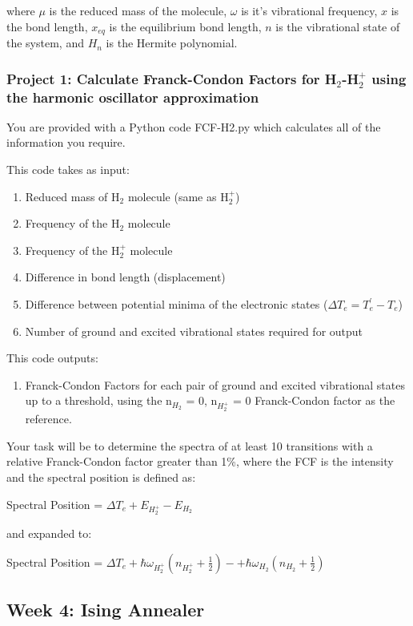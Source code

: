 \documentclass[12pt]{article}
\begin{document}
\noindent where $\mu$ is the reduced mass of the molecule, $\omega$ is it's vibrational frequency, $x$ is the bond length, $x_{eq}$ is the equilibrium bond length, $n$ is the vibrational state of the system, and $H_n$ is the Hermite polynomial.

\subsubsection{Project 1: Calculate Franck-Condon Factors for H$_2$-H$_2^+$ using the harmonic oscillator approximation}
You are provided with a Python code FCF-H2.py which calculates all of the information you require.

\noindent This code takes as input:
\begin{enumerate}
    \item Reduced mass of H$_2$ molecule (same as H$_2^+$)
    \item Frequency of the H$_2$ molecule
    \item Frequency of the H$_2^+$ molecule
    \item Difference in bond length (displacement)
    \item Difference between potential minima of the electronic states ($\Delta T_e = T_e^{'} - T_e$)
    \item Number of ground and excited vibrational states required for output
\end{enumerate}

\noindent This code outputs:
\begin{enumerate}
    \item Franck-Condon Factors for each pair of ground and excited vibrational states up to a threshold, using the n$_{H_2}$ = 0, n$_{H_2^+}$ = 0 Franck-Condon factor as the reference.
\end{enumerate}

\noindent Your task will be to determine the spectra of at least 10 transitions with a relative Franck-Condon factor greater than 1\%, where the FCF is the intensity and the spectral position is defined as:


Spectral Position = $\Delta T_e + E_{H_2^+} - E_{H_2}$

and expanded to:

Spectral Position = $\Delta T_e +\hbar\omega_{H_2^+}(n_{H_2^+} + \frac{1}{2}) - +\hbar\omega_{H_2}(n_{H_2} + \frac{1}{2})$
\newpage

\subsection{Week 4: Ising Annealer}

\newpage



\end{document}
